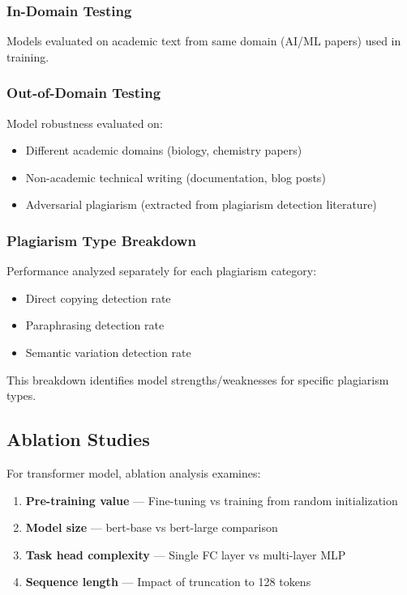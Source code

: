 \subsubsection{In-Domain Testing}

Models evaluated on academic text from same domain (AI/ML papers) used in training.

\subsubsection{Out-of-Domain Testing}

Model robustness evaluated on:
\begin{itemize}
  \item Different academic domains (biology, chemistry papers)
  \item Non-academic technical writing (documentation, blog posts)
  \item Adversarial plagiarism (extracted from plagiarism detection literature)
\end{itemize}

\subsubsection{Plagiarism Type Breakdown}

Performance analyzed separately for each plagiarism category:
\begin{itemize}
  \item Direct copying detection rate
  \item Paraphrasing detection rate
  \item Semantic variation detection rate
\end{itemize}

This breakdown identifies model strengths/weaknesses for specific plagiarism types.

\subsection{Ablation Studies}

For transformer model, ablation analysis examines:

\begin{enumerate}
  \item \textbf{Pre-training value} --- Fine-tuning vs training from random initialization
  
  \item \textbf{Model size} --- bert-base vs bert-large comparison
  
  \item \textbf{Task head complexity} --- Single FC layer vs multi-layer MLP
  
  \item \textbf{Sequence length} --- Impact of truncation to 128 tokens
\end{enumerate}

